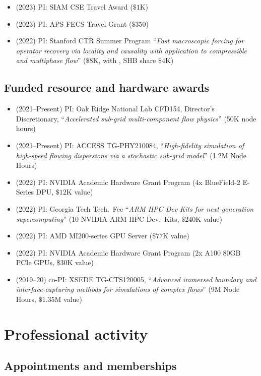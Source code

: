 \begin{itemize}
    \item (2023) PI: SIAM CSE Travel Award ($\$1$K)
    \item (2023) PI: APS FECS Travel Grant ($\$350$)
    \item (2022) PI: Stanford CTR Summer Program ``\textit{Fast macroscopic forcing for operator recovery via locality and causality with application to compressible and multiphase flow}'' ($\$8$K, with \Florian, SHB share $\$4$K)
\end{itemize}

\subsection{Funded resource and hardware awards}

\begin{itemize}
    \item (2021--Present) PI: Oak Ridge National Lab CFD154, Director's Discretionary, ``\textit{Accelerated sub-grid multi-component flow physics}'' (50K node hours)
    \item (2021--Present) PI: ACCESS TG-PHY210084, ``\textit{High-fidelity simulation of high-speed flowing dispersions via a stochastic sub-grid model}'' (1.2M Node Hours)
    \item (2022) PI: NVIDIA Academic Hardware Grant Program (4x BlueField-2 E-Series DPU, $\$12$K value)
    \item (2022) PI: Georgia Tech Tech.\ Fee ``\textit{ARM HPC Dev Kits for next-generation supercomputing}'' (10 NVIDIA ARM HPC Dev.\ Kits, $\$240$K value)
    \item (2022) PI: AMD MI200-series GPU Server ($\$77$K value)
    \item (2022) PI: NVIDIA Academic Hardware Grant Program (2x A100 80GB PCIe GPUs, $\$30$K value)
    \item (2019--20) co-PI: XSEDE TG-CTS120005, ``\textit{Advanced immersed boundary and interface-capturing methods for simulations of complex flows}'' (9M Node Hours, $\$1.35$M value)
\end{itemize}

% 

\section{Professional activity}

\subsection{Appointments and memberships}

